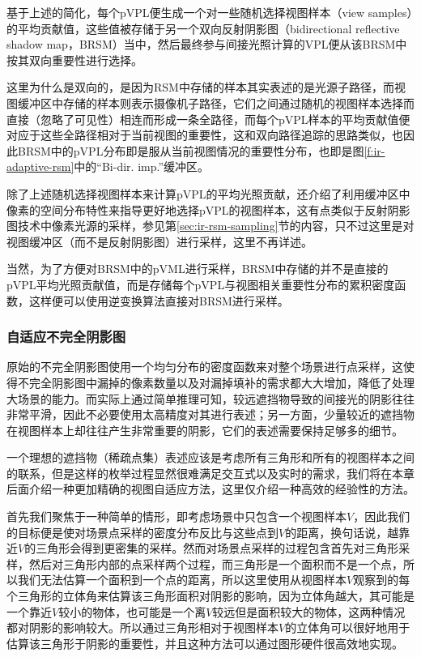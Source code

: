 基于上述的简化，每个pVPL便生成一个对一些随机选择视图样本（view samples）的平均贡献值，这些值被存储于另一个双向反射阴影图（bidirectional reflective shadow map，BRSM）当中，然后最终参与间接光照计算的VPL便从该BRSM中按其双向重要性进行选择。

这里为什么是双向的，是因为RSM中存储的样本其实表述的是光源子路径，而视图缓冲区中存储的样本则表示摄像机子路径，它们之间通过随机的视图样本选择而直接（忽略了可见性）相连而形成一条全路径，而每个pVPL样本的平均贡献值便对应于这些全路径相对于当前视图的重要性，这和双向路径追踪的思路类似，也因此BRSM中的pVPL分布即是服从当前视图情况的重要性分布，也即是图\ref{f:ir-adaptive-rsm}中的“Bi-dir. imp.”缓冲区。

除了上述随机选择视图样本来计算pVPL的平均光照贡献，\cite{a:MakingImperfectShadowMapsViewAdaptive}还介绍了利用缓冲区中像素的空间分布特性来指导更好地选择pVPL的视图样本，这有点类似于反射阴影图技术中像素光源的采样，参见第\ref{sec:ir-rsm-sampling}节的内容，只不过这里是对视图缓冲区（而不是反射阴影图）进行采样，这里不再详述。

当然，为了方便对BRSM中的pVML进行采样，BRSM中存储的并不是直接的pVPL平均光照贡献值，而是存储每个pVPL与视图相关重要性分布的累积密度函数，这样便可以使用逆变换算法直接对BRSM进行采样。





\subsubsection{自适应不完全阴影图}
原始的不完全阴影图使用一个均匀分布的密度函数来对整个场景进行点采样，这使得不完全阴影图中漏掉的像素数量以及对漏掉填补的需求都大大增加，降低了处理大场景的能力。而实际上通过简单推理可知，较远遮挡物导致的间接光的阴影往往非常平滑，因此不必要使用太高精度对其进行表述；另一方面，少量较近的遮挡物在视图样本上却往往产生非常重要的阴影，它们的表述需要保持足够多的细节。

一个理想的遮挡物（稀疏点集）表述应该是考虑所有三角形和所有的视图样本之间的联系，但是这样的枚举过程显然很难满足交互式以及实时的需求，我们将在本章后面介绍一种更加精确的视图自适应方法，这里仅介绍一种高效的经验性的方法。

首先我们聚焦于一种简单的情形，即考虑场景中只包含一个视图样本$V$，因此我们的目标便是使对场景点采样的密度分布反比与这些点到$V$的距离，换句话说，越靠近$V$的三角形会得到更密集的采样。然而对场景点采样的过程包含首先对三角形采样，然后对三角形内部的点采样两个过程，而三角形是一个面积而不是一个点，所以我们无法估算一个面积到一个点的距离，所以这里使用从视图样本$V$观察到的每个三角形的立体角来估算该三角形面积对阴影的影响，因为立体角越大，其可能是一个靠近$V$较小的物体，也可能是一个离$V$较远但是面积较大的物体，这两种情况都对阴影的影响较大。所以通过三角形相对于视图样本$V$的立体角可以很好地用于估算该三角形于阴影的重要性，并且这种方法可以通过图形硬件很高效地实现。

